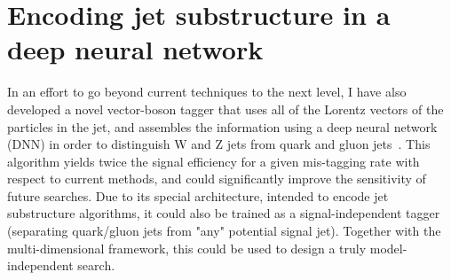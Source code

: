 \documentclass{pasa}%
\begin{document}
\section{Encoding jet substructure in a deep neural network}
\label{sec:DNN}
In an effort to go beyond current techniques to the next level, I have also developed a novel vector-boson tagger that uses all of the Lorentz vectors of the particles in the jet, and assembles the information using a deep neural network (DNN) in order to distinguish W and Z jets from quark and gluon jets~\cite{lola}. This algorithm yields twice the signal efficiency for a given mis-tagging rate with respect to current methods, and could significantly improve the sensitivity of future searches. Due to its special architecture, intended to encode jet substructure algorithms, it could also  be trained as a signal-independent tagger (separating quark/gluon jets from "any" potential signal jet). Together with the multi-dimensional framework, this could be used to design a truly model-independent search.
\end{document}
